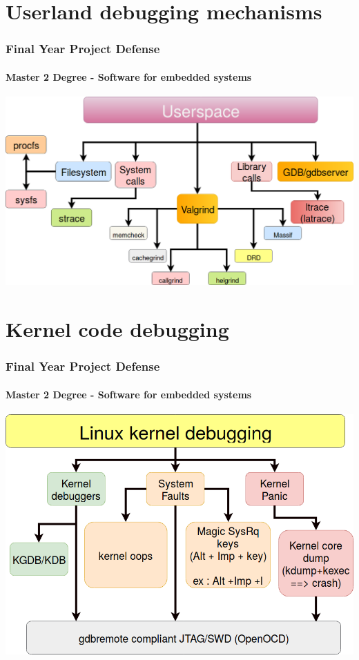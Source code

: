 \documentclass[11pt]{beamer}
\begin{document}
\section{Userland debugging mechanisms}

    \begin{frame}
\frametitle{Final Year Project Defense}

\framesubtitle{Master 2 Degree - Software for embedded systems}
    
    
    
    \includegraphics[scale=0.20]{img/userspace.png}
    
    

    \end{frame}


\section{Kernel code debugging}

    \begin{frame}
\frametitle{Final Year Project Defense}

\framesubtitle{Master 2 Degree - Software for embedded systems}
 \includegraphics[scale=0.20]{img/kernel-debugging-ways1.png}

    \end{frame}
\end{document}

